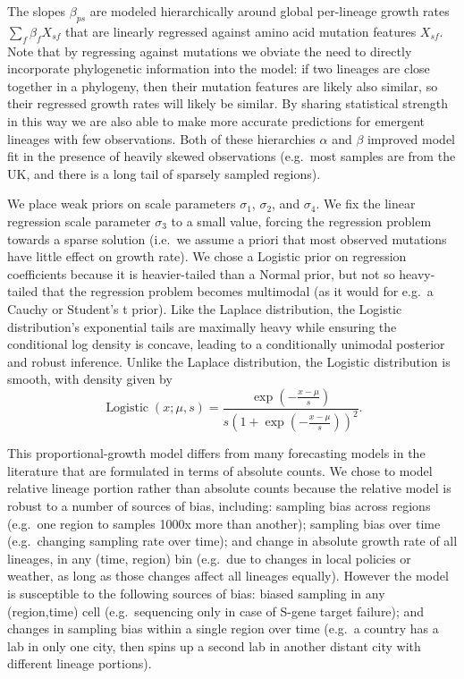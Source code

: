 \documentclass[12pt]{article}
\begin{document}
The slopes $\beta_{ps}$ are modeled hierarchically around global per-lineage growth rates $\sum_f \beta_f X_{sf}$ that are linearly regressed against amino acid mutation features $X_{sf}$.
Note that by regressing against mutations we obviate the need to directly incorporate phylogenetic information into the model: if two lineages are close together in a phylogeny, then their mutation features are likely also similar, so their regressed growth rates will likely be similar.
By sharing statistical strength in this way we are also able to make more accurate predictions for emergent lineages with few observations.
Both of these hierarchies $\alpha$ and $\beta$ improved model fit in the presence of heavily skewed observations (e.g.~most samples are from the UK, and there is a long tail of sparsely sampled regions).

We place weak priors on scale parameters $\sigma_1$, $\sigma_2$, and $\sigma_4$.
We fix the linear regression scale parameter $\sigma_3$ to a small value, forcing the regression problem towards a sparse solution (i.e.~we assume a priori that most observed mutations have little effect on growth rate).
We chose a Logistic prior on regression coefficients because it is heavier-tailed than a Normal prior, but not so heavy-tailed that the regression problem becomes multimodal (as it would for e.g.~a Cauchy or Student's t prior).
Like the Laplace distribution, the Logistic distribution's exponential tails are maximally heavy while ensuring the conditional log density is concave, leading to a conditionally unimodal posterior and robust inference.
Unlike the Laplace distribution, the Logistic distribution is smooth, with density given by
$$
\operatorname{Logistic}(x;\mu,s) = \frac {\exp(-\frac{x-\mu}s)}{s(1 + \exp(-\frac{x-\mu}s))^2}.
$$

This proportional-growth model differs from many forecasting models in the literature that are formulated in terms of absolute counts.
We chose to model relative lineage portion rather than absolute counts because the relative model is robust to a number of sources of bias, including:
sampling bias across regions (e.g.~one region to samples 1000x more than another);
sampling bias over time (e.g.~changing sampling rate over time); and
change in absolute growth rate of all lineages, in any (time, region) bin (e.g.~due to changes in local policies or weather, as long as those changes affect all lineages equally).
However the model is susceptible to the following sources of bias:
biased sampling in any (region,time) cell (e.g.~sequencing only in case of S-gene target failure); and changes in sampling bias within a single region over time (e.g.~a country has a lab in only one city, then spins up a second lab in another distant city with different lineage portions).
\end{document}
